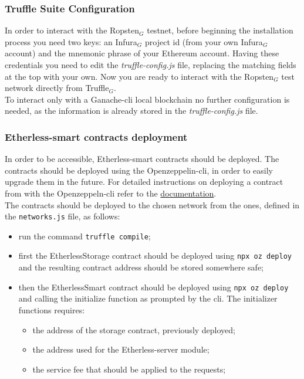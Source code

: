 \subsubsection{Truffle Suite Configuration}
	In order to interact with the Ropsten$_{G}$ testnet, before beginning the installation process you need two keys: an Infura$_{G}$ project id (from your own Infura$_{G}$ account) and the mnemonic phrase of your Ethereum account. Having these credentials you need to edit the \textit{truffle-config.js} file, replacing the matching fields at the top with your own. Now you are ready to interact with the Ropsten$_{G}$ test network directly from Truffle$_{G}$.\\
	To interact only with a Ganache-cli local blockchain no further configuration is needed, as the information is already stored in the \textit{truffle-config.js} file.
\subsubsection{Etherless-smart contracts deployment}
	In order to be accessible, Etherless-smart contracts should be deployed. The contracts should be deployed using the Openzeppelin-cli, in order to easily upgrade them in the future. For detailed instructions on deploying a contract from with the Openzeppeln-cli refer to the \href{https://docs.openzeppelin.com/learn/deploying-and-interacting#deploying-a-smart-contract}{documentation}.\\
	The contracts should be deployed to the chosen network from the ones, defined in the \texttt{networks.js} file, as follows:
	\begin{itemize}
		\item run the command \texttt{truffle compile};
		\item first the EtherlessStorage contract should be deployed using \texttt{npx oz deploy} and the resulting contract address should be stored somewhere safe;
		\item then the EtherlessSmart contract should be deployed using \texttt{npx oz deploy} and calling the initialize function as prompted by the cli. The initializer functions requires:
		\begin{itemize}
			\item the address of the storage contract, previously deployed;
			\item the address used for the Etherless-server module;
			\item the service fee that should be applied to the requests;
		\end{itemize}
	\end{itemize}

